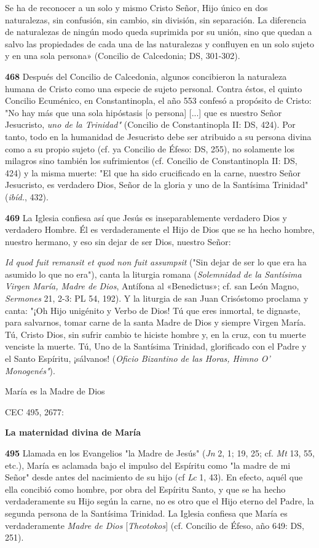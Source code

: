 \documentclass[]{article}
\begin{document}
Se ha de reconocer a un solo y mismo Cristo Señor, Hijo único en dos
naturalezas, sin confusión, sin cambio, sin división, sin separación. La
diferencia de naturalezas de ningún modo queda suprimida por su unión,
sino que quedan a salvo las propiedades de cada una de las naturalezas y
confluyen en un solo sujeto y en una sola persona» (Concilio de
Calcedonia; DS, 301-302).

\textbf{468} Después del Concilio de Calcedonia, algunos concibieron la
naturaleza humana de Cristo como una especie de sujeto personal. Contra
éstos, el quinto Concilio Ecuménico, en Constantinopla, el año 553
confesó a propósito de Cristo: "No hay más que una sola hipóstasis {[}o
persona{]} {[}...{]} que es nuestro Señor Jesucristo, \emph{uno de la
Trinidad"} (Concilio de Constantinopla II: DS, 424). Por tanto, todo en
la humanidad de Jesucristo debe ser atribuido a su persona divina como a
su propio sujeto (cf. ya Concilio de Éfeso: DS, 255), no solamente los
milagros sino también los sufrimientos (cf. Concilio de Constantinopla
II: DS, 424) y la misma muerte: "El que ha sido crucificado en la carne,
nuestro Señor Jesucristo, es verdadero Dios, Señor de la gloria y uno de
la Santísima Trinidad" (\emph{ibíd.}, 432).

\textbf{469} La Iglesia confiesa así que Jesús es inseparablemente
verdadero Dios y verdadero Hombre. Él es verdaderamente el Hijo de Dios
que se ha hecho hombre, nuestro hermano, y eso sin dejar de ser Dios,
nuestro Señor:

\emph{Id quod fuit remansit et quod non fuit assumpsit} ("Sin dejar de
ser lo que era ha asumido lo que no era"), canta la liturgia romana
(\emph{Solemnidad de la Santísima Virgen María, Madre de Dios}, Antífona
al «Benedictus»; cf. san León Magno, \emph{Sermones} 21, 2-3: PL 54,
192). Y la liturgia de san Juan Crisóstomo proclama y canta: "¡Oh Hijo
unigénito y Verbo de Dios! Tú que eres inmortal, te dignaste, para
salvarnos, tomar carne de la santa Madre de Dios y siempre Virgen María.
Tú, Cristo Dios, sin sufrir cambio te hiciste hombre y, en la cruz, con
tu muerte venciste la muerte. Tú, Uno de la Santísima Trinidad,
glorificado con el Padre y el Santo Espíritu, ¡sálvanos! (\emph{Oficio
Bizantino de las Horas, Himno O' Monogenés"}).

María es la Madre de Dios

CEC 495, 2677:  

\textbf{La maternidad divina de María}

\textbf{495} Llamada en los Evangelios "la Madre de Jesús" (\emph{Jn} 2,
1; 19, 25; cf. \emph{Mt} 13, 55, etc.), María es aclamada bajo el
impulso del Espíritu como "la madre de mi Señor" desde antes del
nacimiento de su hijo (cf \emph{Lc} 1, 43). En efecto, aquél que ella
concibió como hombre, por obra del Espíritu Santo, y que se ha hecho
verdaderamente su Hijo según la carne, no es otro que el Hijo eterno del
Padre, la segunda persona de la Santísima Trinidad. La Iglesia confiesa
que María es verdaderamente \emph{Madre de Dios} {[}\emph{Theotokos}{]}
(cf. Concilio de Éfeso, año 649: DS, 251).
\end{document}
